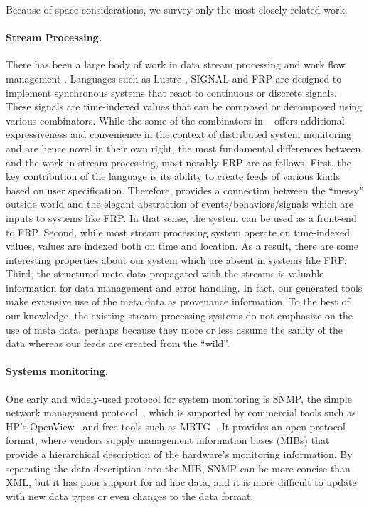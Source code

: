 
Because of space considerations, we survey only the most closely related work.

\paragraph*{Stream Processing.}
There has been a large body of work in data stream processing and work flow
management \cite{Golab03}. Languages such as Lustre \cite{CaspiPHP87}, 
SIGNAL  \cite{AmagbegnonBG95} and FRP \cite{ElliottH97,WanH00}
are designed to implement synchronous systems that react to continuous
or discrete signals. These signals are time-indexed values that can be
composed or decomposed using various combinators. 
While the some of the combinators in \padsd~ offers 
additional expressiveness and convenience in the context of 
distributed system monitoring and are hence novel in their own right, 
the most fundamental differences between \padsd{} and the work in 
stream processing, most notably FRP are as follows.
First, the key contribution of the \padsd{} language is its ability to create
feeds of various kinds based on user specification.  
Therefore, \padsd{} provides a connection between the ``messy'' outside
world and the elegant abstraction of events/behaviors/signals which are inputs
to systems like FRP. In that sense, the \padsd{} system
can be used as a front-end to FRP.
Second, while most stream processing system operate on time-indexed values,
\padsd{} values are indexed both on time and location. As a result, there are
some interesting properties about our system which are absent in systems like FRP.
Third, the structured meta data propagated with the streams is valuable
information for data management and error handling. In fact, our generated tools
make extensive use of the meta data as provenance information. To the best of
our knowledge, the existing stream processing systems do not emphasize on
the use of meta data, perhaps because they more or less assume the sanity 
of the data whereas our feeds are created from the ``wild''. 


\paragraph*{Systems monitoring.}
One early and widely-used protocol for system monitoring is SNMP, the
simple network management protocol~\cite{snmprfc1157}, which is
supported by commercial tools such as HP's OpenView~\cite{openview}
and free tools such as MRTG~\cite{mrtg}. It provides an open protocol
format, where vendors supply management information bases (MIBs)
that provide a hierarchical description of the hardware's monitoring
information. By separating the data description into the MIB, SNMP
can be more concise than XML, but it has poor support for ad hoc
data, and it is more difficult to update with new data types or even 
changes to the data format.


